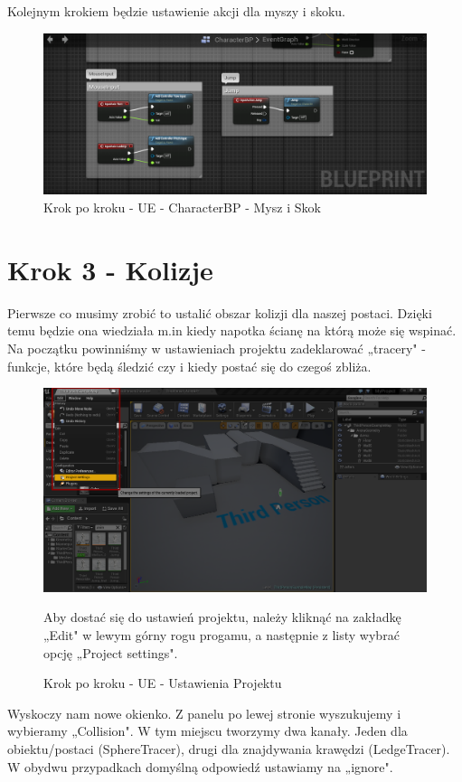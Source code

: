 \documentclass[12pt]{xmgr}
\begin{document}
Kolejnym krokiem będzie ustawienie akcji dla myszy i skoku.

\begin{figure}[!htb]
    \begin{center}
    \includegraphics[scale=0.35]{Screeny/UeKrokPoKroku/UE-CharacterBP-MouseAndJump.png}
    \end{center}
    \caption{Krok po kroku - UE -  CharacterBP - Mysz i Skok}
\end{figure}

\newpage
\section{Krok 3 - Kolizje}

Pierwsze co musimy zrobić to ustalić obszar kolizji dla naszej postaci. Dzięki temu będzie ona wiedziała m.in kiedy napotka ścianę na którą może się wspinać. Na początku powinniśmy w ustawieniach projektu zadeklarować „tracery" - funkcje, które będą śledzić czy i kiedy postać się do czegoś zbliża.

\begin{figure}[!htb]
    \begin{center}
    \includegraphics[scale=0.35]{Screeny/UeKrokPoKroku/UE-Climb-ProjectSettings.png}
    \end{center}
    \caption{Krok po kroku - UE - Ustawienia Projektu}
    Aby dostać się do ustawień projektu, należy kliknąć na zakładkę „Edit" w lewym górny rogu progamu, a następnie z listy wybrać opcję „Project settings".
\end{figure}
\newpage
Wyskoczy nam nowe okienko. Z panelu po lewej stronie wyszukujemy i wybieramy „Collision". W tym miejscu tworzymy dwa kanały. Jeden dla obiektu/postaci (SphereTracer), drugi dla znajdywania krawędzi (LedgeTracer). W obydwu przypadkach domyślną odpowiedź ustawiamy na „ignore".
\end{document}
